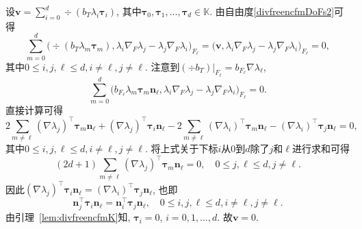 \begin{prf}
设$\boldsymbol{v}=\sum_{i=0}^d\div(b_T\lambda_i\boldsymbol{\tau}_i)$, 其中$\boldsymbol{\tau}_0, \boldsymbol{\tau}_1,\ldots, \boldsymbol{\tau}_d\in\mathbb K$. 由自由度\eqref{divfreencfmDoFs2}可得
\begin{equation*}
\sum_{m=0}^d\big(\div(b_T\lambda_{m}\boldsymbol{\tau}_{m}), \lambda_i\nabla_F \lambda_j-\lambda_j\nabla_F\lambda_i\big)_{F_{\ell}}=\big(\boldsymbol{v}, \lambda_i\nabla_F \lambda_j-\lambda_j\nabla_F\lambda_i\big)_{F_{\ell}}=0,
\end{equation*}
其中$0\leq i,j,\ell\leq d, i\neq\ell, j\neq\ell$. 注意到$(\div b_T)|_{F_{\ell}}=b_{F_{\ell}}\nabla\lambda_{\ell}$,
\begin{equation*}
\sum_{m=0}^d\big(b_{F_{\ell}}\lambda_{m}\boldsymbol{\tau}_{m}\boldsymbol{n}_{\ell}, \lambda_i\nabla_F \lambda_j-\lambda_j\nabla_F\lambda_i\big)_{F_{\ell}}=0.
\end{equation*}
直接计算可得
\begin{equation*}
2\sum_{m\neq\ell}(\nabla \lambda_j)^{\intercal}\boldsymbol{\tau}_{m}\boldsymbol{n}_{\ell} + (\nabla \lambda_j)^{\intercal}\boldsymbol{\tau}_{i}\boldsymbol{n}_{\ell} - 2\sum_{m\neq\ell}(\nabla \lambda_i)^{\intercal}\boldsymbol{\tau}_{m}\boldsymbol{n}_{\ell} - (\nabla \lambda_i)^{\intercal}\boldsymbol{\tau}_{j}\boldsymbol{n}_{\ell}=0,
\end{equation*}
其中$0\leq i,j,\ell\leq d, i\neq\ell, j\neq\ell$. 将上式关于下标$i$从$0$到$d$除了$j$和$\ell$进行求和可得
\begin{equation*}
(2d+1)\sum_{m\neq\ell}(\nabla \lambda_j)^{\intercal}\boldsymbol{\tau}_{m}\boldsymbol{n}_{\ell}=0, \quad 0\leq j,\ell\leq d, j\neq\ell.
\end{equation*}
因此$(\nabla\lambda_j)^{\intercal}\boldsymbol{\tau}_{i}\boldsymbol{n}_{\ell} = (\nabla\lambda_i)^{\intercal}\boldsymbol{\tau}_{j}\boldsymbol{n}_{\ell}$, 也即
\begin{equation*}
\boldsymbol{n}_j^{\intercal}\boldsymbol{\tau}_{i}\boldsymbol{n}_{\ell} = \boldsymbol{n}_i^{\intercal}\boldsymbol{\tau}_{j}\boldsymbol{n}_{\ell}, \quad 0\leq i,j,\ell\leq d, i\neq\ell, j\neq\ell.
\end{equation*}
由引理~\ref{lem:divfreencfmK}知, $\boldsymbol{\tau}_{i}=0$, $i=0,1,\ldots, d$. 故$\boldsymbol{v}=0$.
\end{prf}

